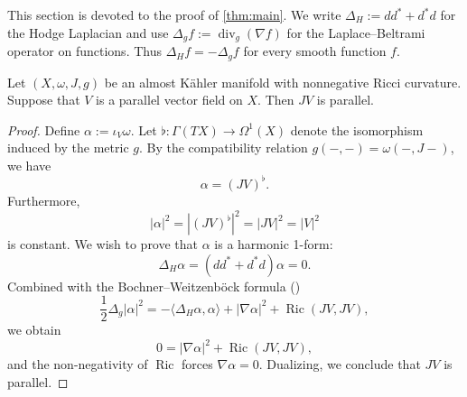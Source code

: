 \documentclass[11pt,twoside]{amsart}
\DeclareMathOperator{\Ric}{Ric}
\begin{document}
This section is devoted to the proof of \autoref{thm:main}. We write
\(
    \Delta_H:=dd^*+d^*d
\)
for the Hodge Laplacian and use
\(
    \Delta_g f:=\operatorname{div}_g(\nabla f)
\)
for the Laplace--Beltrami operator on functions. Thus
\(
    \Delta_H f=-\Delta_g f
\)
for every smooth function $f$.

\begin{lemma}\label{lem:parallel}
    Let $(X,\omega,J,g)$ be an almost K\"ahler manifold with nonnegative Ricci curvature. Suppose that $V$ is a parallel vector field on $X$. Then $JV$ is parallel.
\end{lemma}

\begin{proof}
    Define $\alpha := \iota_V \omega$. 
    Let $\flat \colon \Gamma(TX) \to \Omega^1(X)$ denote the isomorphism induced by the metric $g$.
    By the compatibility relation $g(-,-) = \omega(-,J-)$, 
    we have \[\alpha = (JV)^\flat.\]
    Furthermore, \[|\alpha|^2 = |(JV)^\flat|^2 = |JV|^2=|V|^2\] is constant. 
    We wish to prove that $\alpha$ is a harmonic 1-form: 
    \begin{equation}\label{eq:alpha_harmonic}
        \Delta_H \alpha = (dd^* + d^* d)\alpha = 0.
    \end{equation}
    Combined with the Bochner--Weitzenb\"ock formula (\cite[Lemma 3.4 and Remark 3.2]{Li2012})
    \begin{equation}\label{eq:Bochner_formula}
        \frac{1}{2} \Delta_g |\alpha|^2 = -\langle\Delta_H\alpha, \alpha\rangle+|\nabla \alpha|^2 + {\Ric}(JV,JV),
    \end{equation}
    we obtain 
    $$ 0 = |\nabla \alpha|^2 + {\Ric}(JV,JV),$$
    and the non-negativity of $\Ric$ forces $\nabla \alpha = 0$. Dualizing, we conclude that $JV$ is parallel.


\end{proof}
\end{document}
